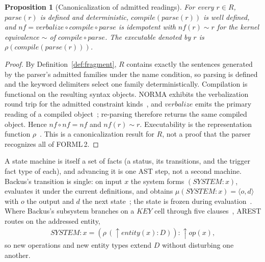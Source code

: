 \documentclass[10pt,twocolumn]{article}
\theoremstyle{plain}
\newtheorem{proposition}{Proposition}
\theoremstyle{definition}
\begin{document}
\begin{proposition}[Canonicalization of admitted readings]\label{prop:spec}
For every $r\in R$, $\mathit{parse}(r)$ is defined and deterministic, $\mathit{compile}(\mathit{parse}(r))$ is well defined, and $\mathit{nf}=\mathit{verbalize}\circ\mathit{compile}\circ\mathit{parse}$ is idempotent with $\mathit{nf}(r)\sim r$ for the kernel equivalence $\sim$ of $\mathit{compile}\circ\mathit{parse}$. The executable denoted by $r$ is $\rho(\mathit{compile}(\mathit{parse}(r)))$.
\end{proposition}
\begin{proof}
By Definition~\ref{def:fragment}, $R$ contains exactly the sentences generated by the parser's admitted families under the name condition, so parsing is defined and the keyword delimiters select one family deterministically. Compilation is functional on the resulting syntax objects. NORMA exhibits the verbalization round trip for the admitted constraint kinds~\cite{norma}, and $\mathit{verbalize}$ emits the primary reading of a compiled object~\cite{halpin06}; re-parsing therefore returns the same compiled object. Hence $\mathit{nf}\circ\mathit{nf}=\mathit{nf}$ and $\mathit{nf}(r)\sim r$. Executability is the representation function $\rho$~\cite[Sec.\,13.4]{backus78}. This is a canonicalization result for $R$, not a proof that the parser recognizes all of FORML\,2.
\end{proof}

\noindent A state machine is itself a set of facts (a status, its transitions, and the trigger fact type of each), and advancing it is one AST step, not a second machine. Backus's transition is single: on input $x$ the system forms $(\mathit{SYSTEM}\!:\!x)$, evaluates it under the current definitions, and obtains $\mu(\mathit{SYSTEM}\!:\!x)=\langle o,d\rangle$ with $o$ the output and $d$ the next state~\cite[Sec.\,14.3.1]{backus78}; the state is frozen during evaluation~\cite[Sec.\,14.6]{backus78}. Where Backus's subsystem branches on a $\mathit{KEY}$ cell through five clauses~\cite[Sec.\,14.4.2]{backus78}, AREST routes on the addressed entity,
\begin{align}
\mathit{SYSTEM}\!:\!x = (\rho\,(\uparrow\!\mathit{entity}(x)\!:\!D))\!:\!\uparrow\!\mathit{op}(x), \label{eq:sys}
\end{align}
so new operations and new entity types extend $D$ without disturbing one another.
\end{document}
